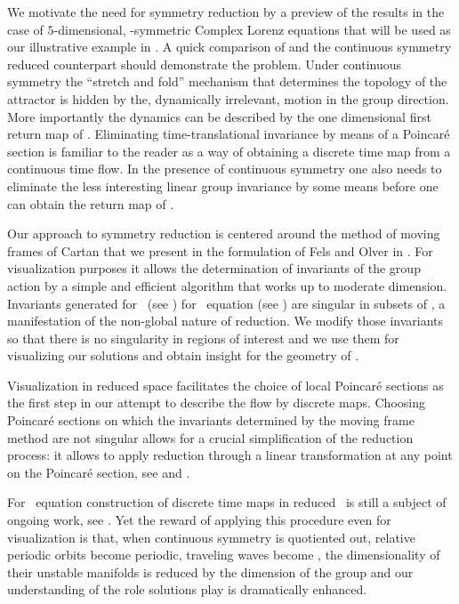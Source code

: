 We motivate the need for symmetry reduction by a preview of the results in the case of $5$-dimensional,
-symmetric Complex Lorenz equations that will be used as our illustrative example in .
 A quick comparison of
 and the continuous symmetry reduced  counterpart should demonstrate the problem.
Under continuous symmetry the ``stretch and fold'' mechanism that determines the topology of the attractor
is hidden by the, dynamically irrelevant, motion in the group direction. More importantly the dynamics can
be described by the one dimensional first return map of . Eliminating time-translational
invariance by means of a Poincar\'e section is familiar to the reader as a way of obtaining a discrete time map from
a continuous time flow. In the presence of continuous symmetry one also needs to eliminate the less interesting
linear group invariance by some means before one can obtain the return map of .

Our approach to symmetry reduction is centered around the method of moving frames of Cartan
that we present in the formulation of Fels and Olver in . For visualization
purposes it allows the determination of invariants of the group action by a simple
and efficient algorithm that works up to moderate dimension.
Invariants generated for \CLe\ (see ) for \KS\ equation
(see ) are singular in subsets of \statesp, a manifestation of the non-global
nature of reduction. We modify those invariants so that there is
no singularity in regions of interest and we use them for visualizing our solutions and obtain insight
for the geometry of \statesp.

Visualization in reduced space facilitates the choice of local Poincar\'e sections as the first step in
our attempt to describe the flow by discrete maps. Choosing Poincar\'e sections on which the invariants
determined by the moving frame method are not singular allows for a crucial simplification of the reduction
process: it allows to apply reduction through a linear transformation at any point on the Poincar\'e section,
see  and
.

For \KS\ equation construction of discrete time maps in reduced \statesp\ is still a subject of ongoing
work, see . Yet the reward of applying this procedure even for visualization
is that, when continuous symmetry is quotiented out, relative periodic
orbits become periodic, traveling waves become \eqva, the dimensionality of their unstable manifolds
is reduced by the dimension of the group and our understanding of the role solutions play is dramatically
enhanced.
